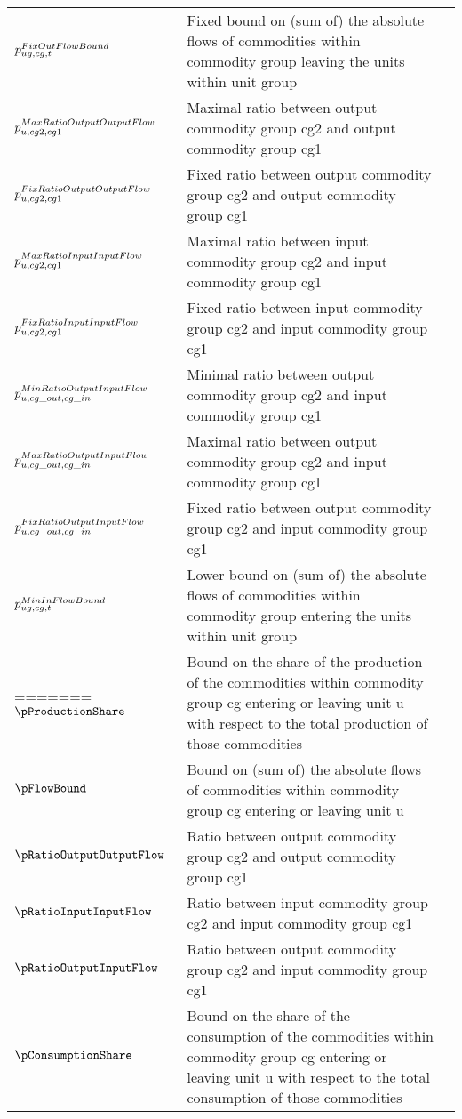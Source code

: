 \begin{longtable}{p{\cola} p{\colc} >{\small\raggedleft\arraybackslash\itshape}p{\colb}}
		$p^{FixOutFlowBound}_{ug,cg,t}$	& Fixed bound on (sum of) the absolute flows of commodities within commodity group \commoditygroup leaving the units within unit group \unitgroup 	&                \\
		$p^{MaxRatioOutputOutputFlow}_{u,cg2,cg1}$	& Maximal ratio between output commodity group cg2 and output commodity group cg1	&                \\
		$p^{FixRatioOutputOutputFlow}_{u,cg2,cg1}$	& Fixed ratio between output commodity group cg2 and output commodity group cg1	&                \\
		$p^{MaxRatioInputInputFlow}_{u,cg2,cg1}$	& Maximal ratio between input commodity group cg2 and input commodity group cg1	&                \\
		$p^{FixRatioInputInputFlow}_{u,cg2,cg1}$	& Fixed ratio between input commodity group cg2 and input commodity group cg1	&                \\
		$p^{MinRatioOutputInputFlow}_{u,cg\_out,cg\_in}$	& Minimal ratio between output commodity group cg2 and input commodity group cg1	&                \\
		$p^{MaxRatioOutputInputFlow}_{u,cg\_out,cg\_in}$	& Maximal ratio between output commodity group cg2 and input commodity group cg1	&                \\
		$p^{FixRatioOutputInputFlow}_{u,cg\_out,cg\_in}$	& Fixed ratio between output commodity group cg2 and input commodity group cg1	&                \\
		$p^{MinInFlowBound}_{ug,cg,t}$	& Lower bound on (sum of) the absolute flows of commodities within commodity group \commoditygroup entering the units within unit group \unitgroup 	&                \\
=======
		$\pProductionShare$	& Bound on the share of the production of the commodities within commodity group cg entering or leaving unit u with respect to the total production of those commodities	&                \\
		$\pFlowBound    $	& Bound on (sum of) the absolute flows of commodities within commodity group cg entering or leaving unit u 	&                \\
		$\pRatioOutputOutputFlow$	& Ratio between output commodity group cg2 and output commodity group cg1	&                \\
		$\pRatioInputInputFlow$	& Ratio between input commodity group cg2 and input commodity group cg1	&                \\
		$\pRatioOutputInputFlow$	& Ratio between output commodity group cg2 and input commodity group cg1	&                \\
		$\pConsumptionShare$	& Bound on the share of the consumption of the commodities within commodity group cg entering or leaving unit u with respect to the total consumption of those commodities	&                \\

\end{longtable}
